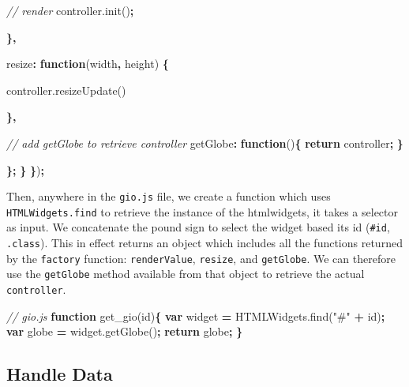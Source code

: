 \documentclass[
]{krantz}
\makeatletter
\newenvironment{Shaded}{\begin{snugshade}}{\end{snugshade}}
\newcommand{\AttributeTok}[1]{\textcolor[rgb]{0.61,0.61,0.61}{#1}}
\newcommand{\CommentTok}[1]{\textcolor[rgb]{0.37,0.37,0.37}{\textit{#1}}}
\newcommand{\ControlFlowTok}[1]{\textcolor[rgb]{0.27,0.27,0.27}{\textbf{#1}}}
\newcommand{\DataTypeTok}[1]{\textcolor[rgb]{0.27,0.27,0.27}{#1}}
\newcommand{\KeywordTok}[1]{\textcolor[rgb]{0.27,0.27,0.27}{\textbf{#1}}}
\newcommand{\NormalTok}[1]{#1}
\newcommand{\OperatorTok}[1]{\textcolor[rgb]{0.43,0.43,0.43}{\textbf{#1}}}
\newcommand{\StringTok}[1]{\textcolor[rgb]{0.5,0.5,0.5}{#1}}
\newcommand{\VariableTok}[1]{\textcolor[rgb]{0,0,0}{#1}}
\newenvironment{kframe}{%
\medskip{}
\setlength{\fboxsep}{.8em}
 \def\at@end@of@kframe{}%
 \ifinner\ifhmode%
  \def\at@end@of@kframe{\end{minipage}}%
  \begin{minipage}{\columnwidth}%
 \fi\fi%
 \def\FrameCommand##1{\hskip\@totalleftmargin \hskip-\fboxsep
 \colorbox{shadecolor}{##1}\hskip-\fboxsep
     \hskip-\linewidth \hskip-\@totalleftmargin \hskip\columnwidth}%
 \MakeFramed {\advance\hsize-\width
   \@totalleftmargin\z@ \linewidth\hsize
   \@setminipage}}%
 {\par\unskip\endMakeFramed%
 \at@end@of@kframe}
\renewenvironment{Shaded}{\begin{kframe}}{\end{kframe}}
\makeatother
\begin{document}
\begin{Shaded}
\begin{Highlighting}[]
        \CommentTok{// render}
        \VariableTok{controller}\NormalTok{.}\AttributeTok{init}\NormalTok{()}\OperatorTok{;}

      \OperatorTok{\},}

      \DataTypeTok{resize}\OperatorTok{:} \KeywordTok{function}\NormalTok{(width}\OperatorTok{,}\NormalTok{ height) }\OperatorTok{\{}

        \VariableTok{controller}\NormalTok{.}\AttributeTok{resizeUpdate}\NormalTok{()}

      \OperatorTok{\},}

      \CommentTok{// add getGlobe to retrieve controller}
      \DataTypeTok{getGlobe}\OperatorTok{:} \KeywordTok{function}\NormalTok{()}\OperatorTok{\{}
        \ControlFlowTok{return}\NormalTok{ controller}\OperatorTok{;}
      \OperatorTok{\}}

    \OperatorTok{\};}
  \OperatorTok{\}}
\OperatorTok{\}}\NormalTok{)}\OperatorTok{;}
\end{Highlighting}
\end{Shaded}

Then, anywhere in the \texttt{gio.js} file, we create a function which uses \texttt{HTMLWidgets.find} to retrieve the instance of the htmlwidgets, it takes a selector as input. We concatenate the pound sign to select the widget based its id (\texttt{\#id}, \texttt{.class}). This in effect returns an object which includes all the functions returned by the \texttt{factory} function: \texttt{renderValue}, \texttt{resize}, and \texttt{getGlobe}. We can therefore use the \texttt{getGlobe} method available from that object to retrieve the actual \texttt{controller}.

\begin{Shaded}
\begin{Highlighting}[]
\CommentTok{// gio.js}
\KeywordTok{function} \AttributeTok{get\_gio}\NormalTok{(id)}\OperatorTok{\{}
  \KeywordTok{var}\NormalTok{ widget }\OperatorTok{=} \VariableTok{HTMLWidgets}\NormalTok{.}\AttributeTok{find}\NormalTok{(}\StringTok{"\#"} \OperatorTok{+}\NormalTok{ id)}\OperatorTok{;}
  \KeywordTok{var}\NormalTok{ globe }\OperatorTok{=} \VariableTok{widget}\NormalTok{.}\AttributeTok{getGlobe}\NormalTok{()}\OperatorTok{;}
  \ControlFlowTok{return}\NormalTok{ globe}\OperatorTok{;}
\OperatorTok{\}}
\end{Highlighting}
\end{Shaded}

\hypertarget{handle-data}{%
\subsection{Handle Data}\label{handle-data}}
\end{document}
